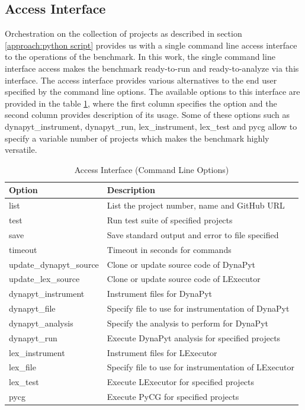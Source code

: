 \subsection{Access Interface}
\label{approach:access interface}
Orchestration on the collection of projects as described in section \ref{approach:python script} provides us with a single command line access interface to the operations of the benchmark.
In this work, the single command line interface access makes the benchmark ready-to-run and ready-to-analyze via this interface.
The access interface provides various alternatives to the end user specified by the command line options.
The available options to this interface are provided in the table \ref{table:access interface options}, where the first column specifies the option and the second column provides description of its usage.
Some of these options such as dynapyt\_instrument, dynapyt\_run, lex\_instrument, lex\_test and pycg allow to specify a variable number of projects which makes the benchmark highly versatile.

\begin{table}[ht]
    \centering
    \begin{tabular}{ll}
    \hline
    \textbf{Option} & \textbf{Description}\\
    \hline
    list    & List the project number, name and GitHub URL\\
    test    & Run test suite of specified projects\\
    save    & Save standard output and error to file specified\\
    timeout & Timeout in seconds for commands\\
    update\_dynapyt\_source   & Clone or update source code of DynaPyt\\
    update\_lex\_source   & Clone or update source code of LExecutor\\
    dynapyt\_instrument  & Instrument files for DynaPyt\\
    dynapyt\_file    & Specify file to use for instrumentation of DynaPyt\\
    dynapyt\_analysis    & Specify the analysis to perform for DynaPyt\\
    dynapyt\_run & Execute DynaPyt analysis for specified projects\\
    lex\_instrument  & Instrument files for LExecutor\\
    lex\_file    & Specify file to use for instrumentation of LExecutor\\
    lex\_test    & Execute LExecutor for specified projects\\
    pycg    & Execute PyCG for specified projects\\
    \hline
    \end{tabular}
    \caption{Access Interface (Command Line Options)}
    \label{table:access interface options}
\end{table}

